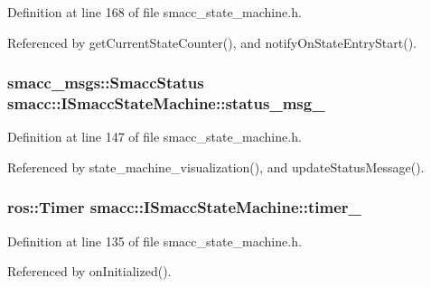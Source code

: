 Definition at line 168 of file smacc\+\_\+state\+\_\+machine.\+h.



Referenced by get\+Current\+State\+Counter(), and notify\+On\+State\+Entry\+Start().

\subsubsection[{\texorpdfstring{status\+\_\+msg\+\_\+}{status_msg_}}]{\setlength{\rightskip}{0pt plus 5cm}smacc\+\_\+msgs\+::\+Smacc\+Status smacc\+::\+I\+Smacc\+State\+Machine\+::status\+\_\+msg\+\_\+\hspace{0.3cm}{\ttfamily [protected]}}\hypertarget{classsmacc_1_1ISmaccStateMachine_a4f47dd614f12a95e7a3c46d465ce4b13}{}\label{classsmacc_1_1ISmaccStateMachine_a4f47dd614f12a95e7a3c46d465ce4b13}


Definition at line 147 of file smacc\+\_\+state\+\_\+machine.\+h.



Referenced by state\+\_\+machine\+\_\+visualization(), and update\+Status\+Message().

\subsubsection[{\texorpdfstring{timer\+\_\+}{timer_}}]{\setlength{\rightskip}{0pt plus 5cm}ros\+::\+Timer smacc\+::\+I\+Smacc\+State\+Machine\+::timer\+\_\+\hspace{0.3cm}{\ttfamily [protected]}}\hypertarget{classsmacc_1_1ISmaccStateMachine_ab6b00dc92aa86f1074d795fb4057e5bc}{}\label{classsmacc_1_1ISmaccStateMachine_ab6b00dc92aa86f1074d795fb4057e5bc}


Definition at line 135 of file smacc\+\_\+state\+\_\+machine.\+h.



Referenced by on\+Initialized().

